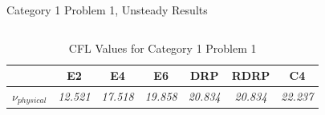 \begin{frame}{Category 1 Problem 1, Unsteady Results}
\begin{columns}
\begin{table}[htp!]
\centering
\caption{CFL Values for Category 1 Problem 1}
\label{tab:C1P1_CFL}
\begin{tabular}{|l|c|c|c|c|c|c|}
\hline
 & \multicolumn{1}{c|}{\textbf{E2}} & \multicolumn{1}{c|}{\textbf{E4}} & \multicolumn{1}{c|}{\textbf{E6}} & \multicolumn{1}{c|}{\textbf{DRP}} & \multicolumn{1}{c|}{\textbf{RDRP}}& \multicolumn{1}{c|}{\textbf{C4}}\\ \hline
\textbf{$\nu_{physical}$} & \textit{12.521} & \textit{17.518} & \textit{19.858} & \textit{20.834} & \textit{20.834} & \textit{22.237}\\ \hline
\end{tabular}
\end{table}
~~ \newline
\begin{figure}[hbtp!]
	\centering
	\includegraphics[width=1.0\textheight]{Figures/C1P1_MaxDisturbance_zoom}
	\label{fig:Unsteady_C1P1}
\end{figure}

    \end{columns}
\end{frame}


